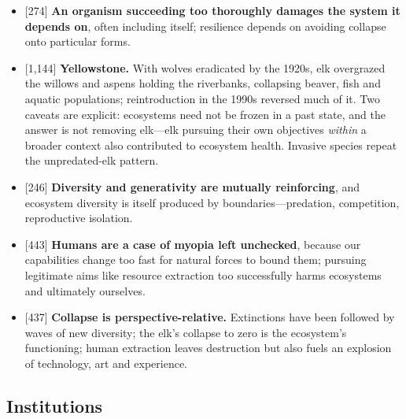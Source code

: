 \documentclass[11pt]{article}
\newcommand{\ct}[1]{{\footnotesize\color{black!55}[#1]}\hspace{1pt}}
\begin{document}
\begin{itemize}
  \item \ct{274} \textbf{An organism succeeding too thoroughly damages the system it depends on}, often including itself; resilience depends on avoiding collapse onto particular forms.
  \item \ct{1,144} \textbf{Yellowstone.} With wolves eradicated by the 1920s, elk overgrazed the willows and aspens holding the riverbanks, collapsing beaver, fish and aquatic populations; reintroduction in the 1990s reversed much of it. Two caveats are explicit: ecosystems need not be frozen in a past state, and the answer is not removing elk---elk pursuing their own objectives \emph{within} a broader context also contributed to ecosystem health. Invasive species repeat the unpredated-elk pattern.
  \item \ct{246} \textbf{Diversity and generativity are mutually reinforcing}, and ecosystem diversity is itself produced by boundaries---predation, competition, reproductive isolation.
  \item \ct{443} \textbf{Humans are a case of myopia left unchecked}, because our capabilities change too fast for natural forces to bound them; pursuing legitimate aims like resource extraction too successfully harms ecosystems and ultimately ourselves.
  \item \ct{437} \textbf{Collapse is perspective-relative.} Extinctions have been followed by waves of new diversity; the elk's collapse to zero is the ecosystem's functioning; human extraction leaves destruction but also fuels an explosion of technology, art and experience.
\end{itemize}

\subsection{Institutions}
\end{document}
